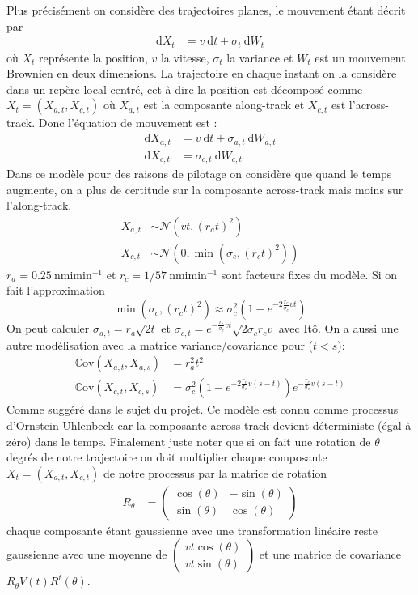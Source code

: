 \documentclass[a4paper, 12pt,twoside]{article}
\numberwithin{equation}{subsection}
\begin{document}
	Plus précisément on considère des trajectoires planes, le mouvement étant décrit par 
		\begin{align}
			\mathrm d X_t &= v ~ \mathrm d t+\sigma_t ~ \mathrm d W_t
		\end{align}
où $X_t$ représente la position, $v$ la vitesse, $\sigma_t$ la variance et $W_t$ est un mouvement Brownien en deux dimensions. La trajectoire en chaque instant on la considère dans un repère local centré, cet à dire la position est décomposé comme $X_t=(X_{a,t},X_{c,t})$ où $X_{a,t}$ est la composante along-track et $X_{c,t}$ est l'across-track. Donc l'équation de mouvement est :
		\begin{align}
			\mathrm d X_{a,t} &= v ~ \mathrm d t+\sigma_{a,t} ~ \mathrm d W_{a,t} \\
			\mathrm d X_{c,t} &= \sigma_{c,t} ~ \mathrm d W_{c,t}
		\end{align}
Dans ce modèle pour des raisons de pilotage on considère que quand le temps augmente, on a plus de certitude sur la composante across-track mais moins sur l'along-track.
\begin{align}
	X_{a,t} &\sim \mathcal{N}(vt,(r_a t)^2) \\
	X_{c,t} &\sim \mathcal{N}(0,\min(\sigma_c, (r_c t)^2))
\end{align}
	$r_a=0.25~ \mathrm{nmi min^{-1}}$ et $r_c=1/57~ \mathrm{nmi min^{-1}}$ sont facteurs fixes du modèle. Si on fait l'approximation 
	$$\min(\sigma_c, (r_c t)^2) \approx \sigma_c^2 (1-e^{-2\frac{r_c}{\sigma_c}vt}) $$
	On peut calculer $\sigma_{a,t}=r_a\sqrt{2t}$ et $\sigma_{c,t}=e^{-\frac{r_c}{\sigma_c}vt}\sqrt{2\sigma_c r_c v}$ avec Itô. On a aussi une autre modélisation avec la matrice variance/covariance pour ($t<s$):
	\begin{align}
		\mathbb{C}\mathrm{ov}(X_{a,t},X_{a,s}) &= r_a^2 t^2 \\
		\mathbb{C}\mathrm{ov}(X_{c,t},X_{c,s}) &= \sigma_{c}^2 (1-e^{-2\frac{r_c}{\sigma_c}v(s-t)})e^{-\frac{r_c}{\sigma_c}v(s-t)}
	\end{align}
	Comme suggéré dans le sujet du projet. Ce modèle est connu comme processus d'Ornstein-Uhlenbeck car la composante across-track devient déterministe (égal à zéro) dans le temps.
	Finalement juste noter que si on fait une rotation de $\theta$ degrés de notre trajectoire on doit multiplier chaque composante $X_t=(X_{a,t},X_{c,t})$ de notre processus par la matrice de rotation 
	\begin{align}
	R_{\theta} &= \left( \begin{array}{cc}
		\cos(\theta) & -\sin(\theta) \\
		\sin(\theta) & \cos(\theta)
	\end{array} \right)
	\end{align}
	chaque composante étant gaussienne avec une transformation linéaire reste gaussienne avec une moyenne de $\left( \begin{array}{c}
		vt \cos(\theta) \\ vt \sin(\theta)
	\end{array} \right)$ 
	et une matrice de covariance $R_\theta V(t) R^t(\theta)$. 
	
\end{document}

